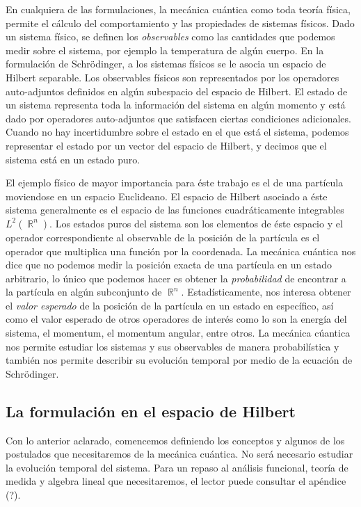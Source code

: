 \documentclass[a4paper]{report}
\DeclareMathOperator{\R}{\mathbb{R}}
\begin{document}
  En cualquiera de las formulaciones, la mecánica cuántica
  como toda teoría física, permite el cálculo del
  comportamiento y las propiedades de sistemas físicos. Dado
  un sistema físico, se definen los \textit{observables}
  como las cantidades que podemos medir sobre el sistema,
  por ejemplo la temperatura de algún cuerpo. En la
  formulación de Schrödinger, a los sistemas físicos se le
  asocia un espacio de Hilbert separable. Los observables
  físicos son representados por los operadores auto-adjuntos
  definidos en algún subespacio del espacio de Hilbert. El
  estado de un sistema representa toda la información del
  sistema en algún momento y está dado por operadores
  auto-adjuntos que satisfacen ciertas condiciones
  adicionales. Cuando no hay incertidumbre sobre el estado
  en el que está el sistema, podemos representar el estado
  por un vector del espacio de Hilbert, y decimos que el
  sistema está en un estado puro.

  El ejemplo físico de mayor importancia para éste trabajo
  es el de una partícula moviendose en un espacio
  Euclideano. El espacio de Hilbert asociado a éste sistema
  generalmente es el espacio de las funciones
  cuadráticamente integrables $L^2(\R^{n})$. Los estados
  puros del sistema son los elementos de éste espacio y el
  operador correspondiente al observable de la posición de
  la partícula es el operador que multiplica una función por
  la coordenada. La mecánica cuántica nos dice que no
  podemos medir la posición exacta de una partícula en un
  estado arbitrario, lo único que podemos hacer es obtener
  la \textit{probabilidad} de encontrar a la partícula en
  algún subconjunto de $\R^{n}$.  Estadísticamente, nos
  interesa obtener el \textit{valor esperado} de la posición
  de la partícula en un estado en específico, así como el
  valor esperado de otros operadores de interés como lo son
  la energía del sistema, el momentum, el momentum angular,
  entre otros. La mecánica cúantica nos permite estudiar los
  sistemas y sus observables de manera probabilística y
  también nos permite describir su evolución temporal por
  medio de la ecuación de Schrödinger. 
  
  \subsection{La formulación en el espacio de Hilbert}

  Con lo anterior aclarado, comencemos definiendo los
  conceptos y algunos de los postulados que necesitaremos de
  la mecánica cuántica. No será necesario estudiar la
  evolución temporal del sistema. Para un repaso al análisis
  funcional, teoría de medida y algebra lineal que
  necesitaremos, el lector puede consultar el apéndice (?).
\end{document}
